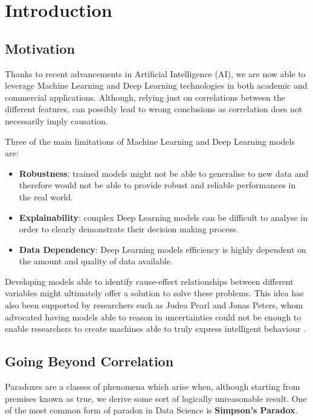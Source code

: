 \chapter{Introduction}
\section{Motivation}
\vspace{-0.1cm}
Thanks to recent advancements in Artificial Intelligence (AI), we are now able to leverage Machine Learning and Deep Learning technologies in both academic and commercial applications. Although, relying just on correlations between the different features, can possibly lead to wrong conclusions as correlation does not necessarily imply causation.

Three of the main limitations of Machine Learning and Deep Learning models are: 
\vspace{-0.2cm}
\begin{itemize}
    \item \textbf{Robustness}: trained models might not be able to generalise to new data and therefore would not be able to provide robust and reliable performances in the real world.
    \item \textbf{Explainability}: complex Deep Learning models can be difficult to analyse in order to clearly demonstrate their decision making process. 
    \item \textbf{Data Dependency}: Deep Learning models efficiency is highly dependent on the amount and quality of data available. 
\end{itemize}
\vspace{-0.2cm}
Developing models able to identify cause-effect relationships between different variables might ultimately offer a solution to solve these problems. This idea has also been supported by researchers such as Judea Pearl and Jonas Peters, whom advocated having models able to reason in uncertainties could not be enough to enable researchers to create machines able to truly express intelligent behaviour \cite{art_perl}.

\section{Going Beyond Correlation}
\label{simp_ref}
Paradoxes are a classes of phenomena which arise when, although starting from premises known as true, we derive some sort of logically unreasonable result. One of the most common form of paradox in Data Science is \textbf{Simpson's Paradox}.

